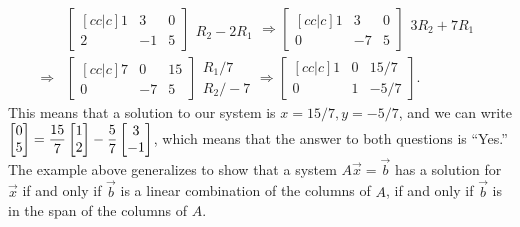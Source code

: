 {\begin{align*}
   &\begin{bmatrix}[cc|c]1&3& 0\\2&-1&5\end{bmatrix}\begin{array}{l}\\ R_2-2R_1\end{array}
 \Rightarrow 
   \begin{bmatrix}[cc|c]1&3& 0\\0&-7&5\end{bmatrix} \begin{array}{l} 3R_2+7R_1\\ \ \end{array}\\
 \Rightarrow 
   &\begin{bmatrix}[cc|c]7&0& 15\\0&-7&5\end{bmatrix} \begin{array}{l}R_1/7\\ R_2/-7\end{array}
 \Rightarrow 
   \begin{bmatrix}[cc|c]1&0& 15/7\\0&1&-5/7\end{bmatrix}.
\end{align*}
This means that a solution to our system is $x=15/7, y=-5/7$, and we can write $\displaystyle\begin{bmatrix} 0\\5\end{bmatrix} = \frac{15}{7}\begin{bmatrix} 1\\2\end{bmatrix}-\frac{5}{7}\begin{bmatrix} 3\\-1\end{bmatrix}$, which means that the answer to both questions is ``Yes.''  The example above generalizes to show that a system $A \vec x = \vec b$ has a solution for $\vec x$ if and only if $\vec b$ is a linear combination of the columns of $A$, if and only if $\vec b$ is in the span of the columns of $A$.





}
